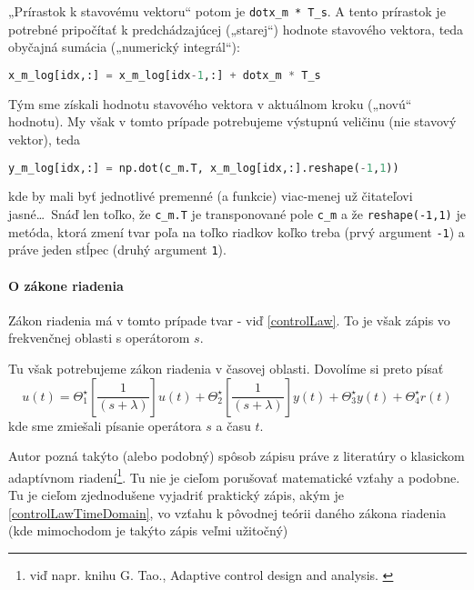 \documentclass[a4paper, 10pt, ]{article}
\begin{document}
„Prírastok k stavovému vektoru“ potom je \lstinline|dotx_m * T_s|. A tento prírastok je potrebné pripočítať k predchádzajúcej („starej“) hodnote stavového vektora, teda obyčajná sumácia („numerický integrál“):
\begin{lstlisting}[language=Python,
                    numbers=none,
                    caption={},
                    label={vypk_sht02},
                    ]
x_m_log[idx,:] = x_m_log[idx-1,:] + dotx_m * T_s
\end{lstlisting}
Tým sme získali hodnotu stavového vektora v aktuálnom kroku („novú“ hodnotu). My však v tomto prípade potrebujeme výstupnú veličinu (nie stavový vektor), teda
\begin{lstlisting}[language=Python,
                    numbers=none,
                    caption={},
                    label={vypk_sht03},
                    ]
y_m_log[idx,:] = np.dot(c_m.T, x_m_log[idx,:].reshape(-1,1))
\end{lstlisting}
kde by mali byť jednotlivé premenné (a funkcie) viac-menej už čitateľovi jasné\ldots\  Snáď len toľko, že \lstinline|c_m.T| je transponované pole \lstinline|c_m| a že \lstinline|reshape(-1,1)| je metóda, ktorá zmení tvar poľa na toľko riadkov koľko treba (prvý argument \lstinline|-1|) a práve jeden stĺpec (druhý argument \lstinline|1|).







\paragraph{O zákone riadenia}

Zákon riadenia má v tomto prípade tvar - viď \eqref{controlLaw}. To je však zápis vo frekvenčnej oblasti s operátorom $s$.

Tu však potrebujeme zákon riadenia v časovej oblasti. Dovolíme si preto písať
\begin{equation} \label{controlLawTimeDomain}
	u(t) = \Theta_1^\star  \left[ \frac{1}{(s + \lambda)} \right] u(t)
    + \Theta_2^\star \left[ \frac{1}{(s + \lambda)} \right] y(t)
    + \Theta_3^\star y(t) + \Theta_4^\star r(t)
\end{equation}
kde sme zmiešali písanie operátora $s$ a času $t$.

Autor pozná takýto (alebo podobný) spôsob zápisu práve z literatúry o klasickom adaptívnom riadení\footnote{viď napr. knihu G. Tao., Adaptive control design and analysis. \cite{Tao03}}. Tu nie je cieľom porušovať matematické vzťahy a podobne. Tu je cieľom zjednodušene vyjadriť praktický zápis, akým je \eqref{controlLawTimeDomain}, vo vzťahu k pôvodnej teórii daného zákona riadenia (kde mimochodom je takýto zápis veľmi užitočný)
\end{document}
